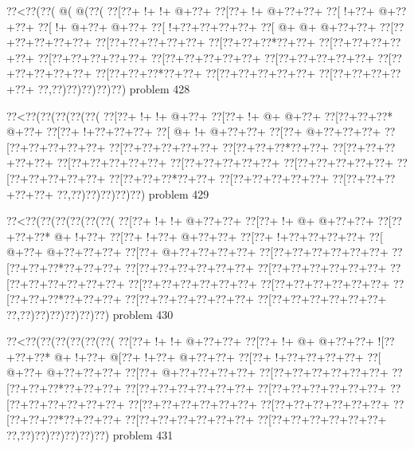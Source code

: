 \vbox{\vbox{\goo
\0??<\0??(\0??(\- @(\- @(\0??(
\0??[\0??+\- !+\- !+\- @+\0??+
\0??[\0??+\- !+\- @+\0??+\0??+
\0??[\- !+\0??+\- @+\0??+\0??+
\0??[\- !+\- @+\0??+\- @+\0??+
\0??[\- !+\0??+\0??+\0??+\0??+
\0??[\- @+\- @+\- @+\0??+\0??+
\0??[\0??+\0??+\0??+\0??+\0??+
\0??[\0??+\0??+\0??+\0??+\0??+
\0??[\0??+\0??+\0??*\0??+\0??+
\0??[\0??+\0??+\0??+\0??+\0??+
\0??[\0??+\0??+\0??+\0??+\0??+
\0??[\0??+\0??+\0??+\0??+\0??+
\0??[\0??+\0??+\0??+\0??+\0??+
\0??[\0??+\0??+\0??+\0??+\0??+
\0??[\0??+\0??+\0??*\0??+\0??+
\0??[\0??+\0??+\0??+\0??+\0??+
\0??[\0??+\0??+\0??+\0??+\0??+
\0??,\0??)\0??)\0??)\0??)\0??)
}
\hfil problem 428\hfil\break
}

\vbox{\vbox{\goo
\0??<\0??(\0??(\0??(\0??(\0??(
\0??[\0??+\- !+\- !+\- @+\0??+
\0??[\0??+\- !+\- @+\- @+\0??+
\0??[\0??+\0??+\0??*\- @+\0??+
\0??[\0??+\- !+\0??+\0??+\0??+
\0??[\- @+\- !+\- @+\0??+\0??+
\0??[\0??+\- @+\0??+\0??+\0??+
\0??[\0??+\0??+\0??+\0??+\0??+
\0??[\0??+\0??+\0??+\0??+\0??+
\0??[\0??+\0??+\0??*\0??+\0??+
\0??[\0??+\0??+\0??+\0??+\0??+
\0??[\0??+\0??+\0??+\0??+\0??+
\0??[\0??+\0??+\0??+\0??+\0??+
\0??[\0??+\0??+\0??+\0??+\0??+
\0??[\0??+\0??+\0??+\0??+\0??+
\0??[\0??+\0??+\0??*\0??+\0??+
\0??[\0??+\0??+\0??+\0??+\0??+
\0??[\0??+\0??+\0??+\0??+\0??+
\0??,\0??)\0??)\0??)\0??)\0??)
}
\hfil problem 429\hfil\break
}

\vbox{\vbox{\goo
\0??<\0??(\0??(\0??(\0??(\0??(\0??(
\0??[\0??+\- !+\- !+\- @+\0??+\0??+
\0??[\0??+\- !+\- @+\- @+\0??+\0??+
\0??[\0??+\0??+\0??*\- @+\- !+\0??+
\0??[\0??+\- !+\0??+\- @+\0??+\0??+
\0??[\0??+\- !+\0??+\0??+\0??+\0??+
\0??[\- @+\0??+\- @+\0??+\0??+\0??+
\0??[\0??+\- @+\0??+\0??+\0??+\0??+
\0??[\0??+\0??+\0??+\0??+\0??+\0??+
\0??[\0??+\0??+\0??*\0??+\0??+\0??+
\0??[\0??+\0??+\0??+\0??+\0??+\0??+
\0??[\0??+\0??+\0??+\0??+\0??+\0??+
\0??[\0??+\0??+\0??+\0??+\0??+\0??+
\0??[\0??+\0??+\0??+\0??+\0??+\0??+
\0??[\0??+\0??+\0??+\0??+\0??+\0??+
\0??[\0??+\0??+\0??*\0??+\0??+\0??+
\0??[\0??+\0??+\0??+\0??+\0??+\0??+
\0??[\0??+\0??+\0??+\0??+\0??+\0??+
\0??,\0??)\0??)\0??)\0??)\0??)\0??)
}
\hfil problem 430\hfil\break
}

\vbox{\vbox{\goo
\0??<\0??(\0??(\0??(\0??(\0??(\0??(
\0??[\0??+\- !+\- !+\- @+\0??+\0??+
\0??[\0??+\- !+\- @+\- @+\0??+\0??+
\- ![\0??+\0??+\0??*\- @+\- !+\0??+
\- @[\0??+\- !+\0??+\- @+\0??+\0??+
\0??[\0??+\- !+\0??+\0??+\0??+\0??+
\0??[\- @+\0??+\- @+\0??+\0??+\0??+
\0??[\0??+\- @+\0??+\0??+\0??+\0??+
\0??[\0??+\0??+\0??+\0??+\0??+\0??+
\0??[\0??+\0??+\0??*\0??+\0??+\0??+
\0??[\0??+\0??+\0??+\0??+\0??+\0??+
\0??[\0??+\0??+\0??+\0??+\0??+\0??+
\0??[\0??+\0??+\0??+\0??+\0??+\0??+
\0??[\0??+\0??+\0??+\0??+\0??+\0??+
\0??[\0??+\0??+\0??+\0??+\0??+\0??+
\0??[\0??+\0??+\0??*\0??+\0??+\0??+
\0??[\0??+\0??+\0??+\0??+\0??+\0??+
\0??[\0??+\0??+\0??+\0??+\0??+\0??+
\0??,\0??)\0??)\0??)\0??)\0??)\0??)
}
\hfil problem 431\hfil\break
}

